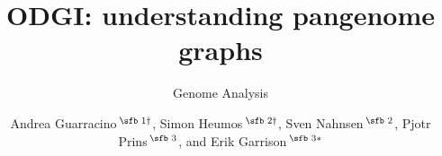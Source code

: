\documentclass{bioinfo}
\begin{document}

\subtitle{Genome Analysis}

\title[short Title]{ODGI: understanding pangenome graphs}
\author[Guarracino, Heumos \textit{et~al}.]{
Andrea Guarracino\,$^{\text{\sfb 1} \dagger}$,
Simon Heumos\,$^{\text{\sfb 2} \dagger}$,
Sven Nahnsen\,$^{\text{\sfb 2}}$,
Pjotr Prins\,$^{\text{\sfb 3}}$,
and Erik Garrison\,$^{\text{\sfb 3}*}$
}

\address{
$^{\text{\sf 1}}$University of Tor Vergata, Rome, Italy \\
$^{\text{\sf 2}}$Quantitative Biology Center (QBiC), University of T\"ubingen, T\"ubingen, Germany, 72076 \\
$^{\text{\sf 3}}$University of Tennessee Health Science Center, Memphis, TN, USA
}




\end{document}
